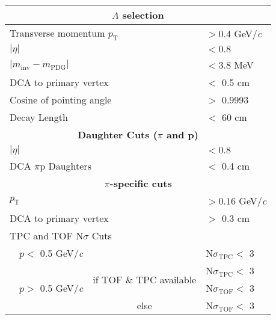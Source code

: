 \documentclass[ALICE,manyauthors]{cernphprep}
\newcommand{\Lam}{$\Lambda$\xspace}
\begin{document}
\begin{table}[htbp]
 \centering 
  \begin{tabular}{lc|c|l}
   \hline  
   \multicolumn{4}{c}{\textbf{\Lam selection}} \\
   \hline
   \multicolumn{3}{l|}{Transverse momentum $p_{\mathrm{T}}$} & $> 0.4$ GeV/\textit{c} \\
   \hline
   \multicolumn{3}{l|}{$|\eta|$} & $< 0.8$ \\
   \hline
   \multicolumn{3}{l|}{$|m_{\mathrm{inv}} - m_{\mathrm{PDG}}|$} & $< 3.8$ MeV \\ 
   \hline
   \multicolumn{3}{l|}{DCA to primary vertex} & $<$ 0.5 cm \\
   \hline
   \multicolumn{3}{l|}{Cosine of pointing angle} & $>$ 0.9993 \\
   \hline
   \multicolumn{3}{l|}{Decay Length} & $<$ 60 cm \\
   \hline
   
   
   \multicolumn{4}{c}{\textbf{Daughter Cuts ($\pi$ and p)}} \\
   \hline
   \multicolumn{3}{l|}{$|\eta|$} &  $< 0.8$ \\
   \hline
   \multicolumn{3}{l|}{DCA $\pi$p Daughters} & $<$ 0.4 cm \\
   \hline
   
   
   \multicolumn{4}{c}{\textbf{$\pi$-specific cuts}} \\
   \hline
   \multicolumn{3}{l|}{$p_{\mathrm{T}}$} & $> 0.16$ GeV/\textit{c} \\
   \hline
   \multicolumn{3}{l|}{DCA to primary vertex} & $>$ 0.3 cm \\
   \hline
   \multicolumn{4}{l}{TPC and TOF N$\sigma$ Cuts} \\
   \cline{2-4}
    & \multicolumn{1}{c}{$p <$ 0.5 GeV/\textit{c}} &  & N$\sigma_{\mathrm{TPC}} <$ 3 \\
   \cline{2-4}
    & \multicolumn{1}{c}{\multirow{3}{*}{$p >$ 0.5 GeV/\textit{c}}} &  \multirow{2}{*}{if TOF \& TPC available} & N$\sigma_{\mathrm{TPC}} <$ 3 \\
    & \multicolumn{2}{c|}{} & N$\sigma_{\mathrm{TOF}} <$ 3 \\
   \cline{3-4}
    & \multicolumn{1}{c}{} & else & N$\sigma_{\mathrm{TOF}} <$ 3 \\
   \hline
   

\end{tabular}
\end{table}
\end{document}
